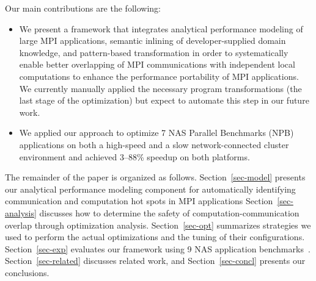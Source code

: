 Our main contributions are the following:
\begin{itemize}
 \item We present a framework that integrates analytical performance modeling of large MPI applications, semantic inlining of developer-supplied domain knowledge, and pattern-based transformation in order to systematically enable better overlapping of MPI communications with independent local computations to enhance the performance portability of MPI applications. We currently manually applied the necessary program transformations (the last stage of the optimization) but expect to automate this step in our future work. 
  \item We applied our approach to optimize 7 NAS Parallel Benchmarks (NPB) applications on both a high-speed and a slow network-connected cluster environment and achieved 3--88\% speedup on both platforms.
\end{itemize}


The remainder of the paper is organized as follows.
Section~\ref{sec-model} presents our analytical performance modeling component for automatically identifying communication and computation hot spots in MPI applications
Section~\ref{sec-analysis} discusses how to determine the safety of computation-communication overlap through optimization analysis.
Section~\ref{sec-opt} summarizes strategies we used to perform the actual optimizations and the tuning of their configurations.
Section~\ref{sec-exp} evaluates our framework using 9 NAS application benchmarks~\cite{npb}.
Section~\ref{sec-related} discusses related work, and
Section~\ref{sec-concl} presents our conclusions.



